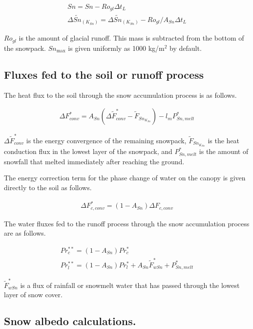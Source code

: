 \begin{eqnarray}
 Sn = Sn - Ro_{gl} \Delta t_L \\
 \Delta \widetilde{Sn}_{(K_{Sn})} = \Delta \widetilde{Sn}_{(K_{Sn})}
 - Ro_{gl} / A_{Sn} \Delta t_L
\end{eqnarray}

\(Ro_{gl}\) is the amount of glacial runoff. This mass is subtracted
from the bottom of the snowpack. \(Sn_{\max}\) is given uniformly as
1000 kg/m\(^2\) by default.

\hypertarget{fluxes-fed-to-the-soil-or-runoff-process}{%
\subsection{Fluxes fed to the soil or runoff
process}\label{fluxes-fed-to-the-soil-or-runoff-process}}

The heat flux to the soil through the snow accumulation process is as
follows.

\begin{eqnarray}
\Delta F_{conv}^* = A_{Sn} ( \Delta \widetilde{F}_{conv}^* - \widetilde{F}_{Sn_{K_{Sn}}} ) - l_m P_{Sn,melt}^*
\end{eqnarray}

\(\Delta \widetilde{F}_{conv}^*\) is the energy convergence of the
remaining snowpack, \(\widetilde{F}_{Sn_{K_{Sn}}}\) is the heat
conduction flux in the lowest layer of the snowpack, and
\(P_{Sn,melt}^*\) is the amount of snowfall that melted immediately
after reaching the ground.

The energy correction term for the phase change of water on the canopy
is given directly to the soil as follows.

\begin{eqnarray}
 \Delta F_{c,conv}^* = ( 1 - A_{Sn}) \Delta F_{c,conv}
\end{eqnarray}

The water fluxes fed to the runoff process through the snow accumulation
process are as follows.

\begin{eqnarray}
 Pr_c^{**} = ( 1 - A_{Sn} ) Pr_c^{*} \\
 Pr_l^{**} = ( 1 - A_{Sn} ) Pr_l^{*} + A_{Sn} \widetilde{F}_{wSn}^*
 + P_{Sn,melt}^*
\end{eqnarray}

\(\widetilde{F}_{wSn}^*\) is a flux of rainfall or snowmelt water that
has passed through the lowest layer of snow cover.

\hypertarget{snow-albedo-calculations.}{%
\subsection{Snow albedo calculations.}\label{snow-albedo-calculations.}}

